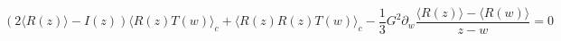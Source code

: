 \begin{equation}
(2 \langle R(z)\rangle - I(z))\langle R(z) T(w)\rangle_c + 
\langle R(z) R(z) T(w)\rangle_c-  \frac{1}{3}
G^2 \partial_w \frac{\langle R(z)\rangle -\langle R(w)\rangle}{z-w}=0
\label{rtc}
\end{equation}

